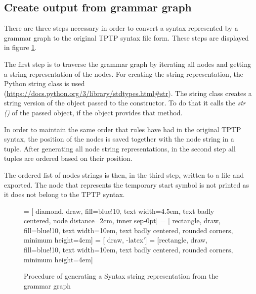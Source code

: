 \subsection{Create output from grammar graph}\label{sec:ConceptOutputGrammarGraph}

There are three steps necessary in order to convert a syntax represented by a grammar graph to the original \ac{TPTP} syntax file form. These steps are displayed in figure \ref{fig:ConceptOutputGrammarGraphProcedure}.

The first step is to traverse the grammar graph by iterating all nodes and getting a string representation of the nodes.
For creating the string representation, the Python string class is used (\url{https://docs.python.org/3/library/stdtypes.html#str}). The string class creates a string version of the object passed to the constructor.
To do that it calls the \textit{\textunderscore \textunderscore str \textunderscore \textunderscore ()} of the passed object, if the object provides that method.

In order to maintain the same order that rules have had in the original \ac{TPTP} syntax, the position of the nodes is saved together with the node string in a tuple. 
After generating all node string representations, in the second step all tuples are ordered based on their position. 

The ordered list of nodes strings is then, in the third step, written to a file and exported.
The node that represents the temporary start symbol is not printed as it does not belong to the \ac{TPTP} syntax. 
 
\begin{figure}[H]
 = [ diamond, draw, fill=blue!10, text width=4.5em, text badly centered, node distance=2cm, inner sep-0pt]  
 = [ rectangle, draw, fill=blue!10, text width=10em, text badly centered, rounded corners, minimum height=4em]  
 = [ draw, -latex']  
 = [rectangle, draw, fill=blue!10, text width=10em, text badly centered, rounded corners, minimum height=4em]  
\begin{center}
\end{center}
\caption{Procedure of generating a Syntax string representation from the grammar graph}
\label{fig:ConceptOutputGrammarGraphProcedure}
\end{figure}

